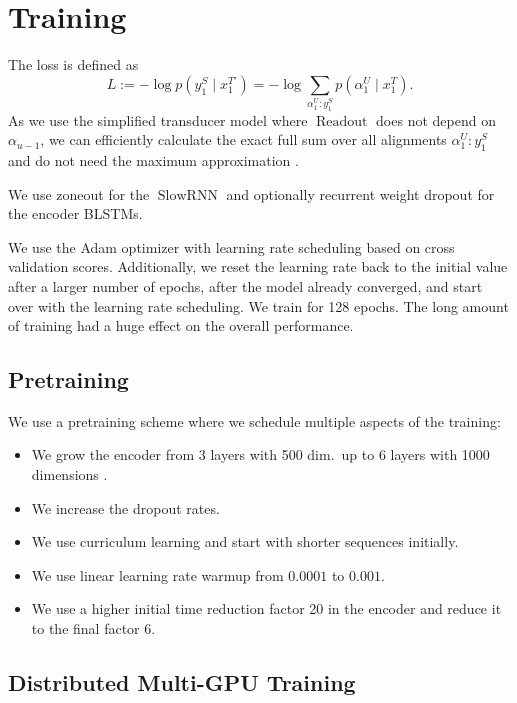 \documentclass[a4paper]{article}
\begin{document}
\section{Training}

The loss is defined as
\[ L := -\log p(y_1^S \mid x_1^{T'}) = -\log \sum_{\alpha_1^U : y_1^S} p(\alpha_1^U \mid x_1^T) . \]
As we use the simplified transducer model
where $\operatorname{Readout}$ does not depend on $\alpha_{u-1}$,
we can efficiently calculate the exact full sum over all alignments $\alpha_1^U : y_1^S$
and do not need the maximum approximation \cite{zeyer2020:transducer}.

We use zoneout \cite{krueger2017zoneout} for the $\operatorname{SlowRNN}$
and optionally recurrent weight dropout \cite{wan13dropconnect} for the encoder BLSTMs.

We use the Adam optimizer \cite{kingma2015adam}
with learning rate scheduling based on cross validation scores.
Additionally, we reset the learning rate back to the initial value after a larger number of epochs,
after the model already converged,
and start over with the learning rate scheduling.
We train for 128 epochs. The long amount of training had a huge effect on the overall performance.

\subsection{Pretraining}

We use a pretraining scheme
where we schedule multiple aspects of the training:
\begin{itemize}
\item We grow the encoder from 3 layers with 500 dim.~up to 6 layers with 1000 dimensions \cite{zeyer2018:attanalysis}.
\item We increase the dropout rates.
\item
We use curriculum learning and start with shorter sequences initially.
\item We use linear learning rate warmup from $0.0001$ to $0.001$.
\item We use a higher initial time reduction factor 20 in the encoder
and reduce it to the final factor 6.
\end{itemize}

\subsection{Distributed Multi-GPU Training}
\end{document}
